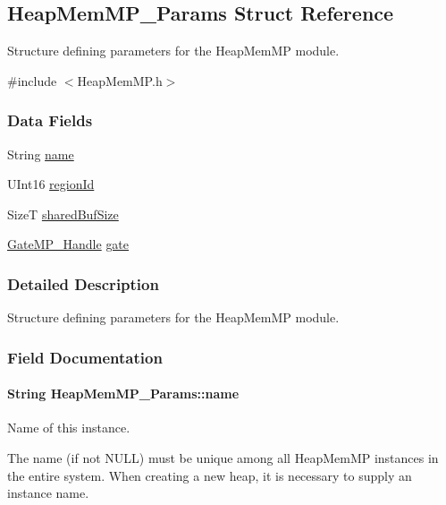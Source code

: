 \subsection{HeapMemMP\_\-Params Struct Reference}
\label{struct_heap_mem_m_p___params}


Structure defining parameters for the HeapMemMP module.  




{\ttfamily \#include $<$HeapMemMP.h$>$}

\subsubsection*{Data Fields}
\begin{DoxyCompactItemize}
\item 
String \hyperlink{struct_heap_mem_m_p___params_a6b71abc682a2b5503fde320e29a1a5f7}{name}
\item 
UInt16 \hyperlink{struct_heap_mem_m_p___params_ad1a5b94d015d0b5b75f091ca9be8a04e}{regionId}
\item 
SizeT \hyperlink{struct_heap_mem_m_p___params_a7206d2bd65bf705da74310fd004b67bf}{sharedBufSize}
\item 
\hyperlink{_gate_m_p_8h_ad5bb259f928a14e98d973334bc60ebb3}{GateMP\_\-Handle} \hyperlink{struct_heap_mem_m_p___params_ab07964aed674d108f19482a0d35e4e46}{gate}
\end{DoxyCompactItemize}


\subsubsection{Detailed Description}
Structure defining parameters for the HeapMemMP module. 

\subsubsection{Field Documentation}
\paragraph[{name}]{\setlength{\rightskip}{0pt plus 5cm}String {\bf HeapMemMP\_\-Params::name}}\hfill\label{struct_heap_mem_m_p___params_a6b71abc682a2b5503fde320e29a1a5f7}
Name of this instance.

The name (if not NULL) must be unique among all HeapMemMP instances in the entire system. When creating a new heap, it is necessary to supply an instance name.

